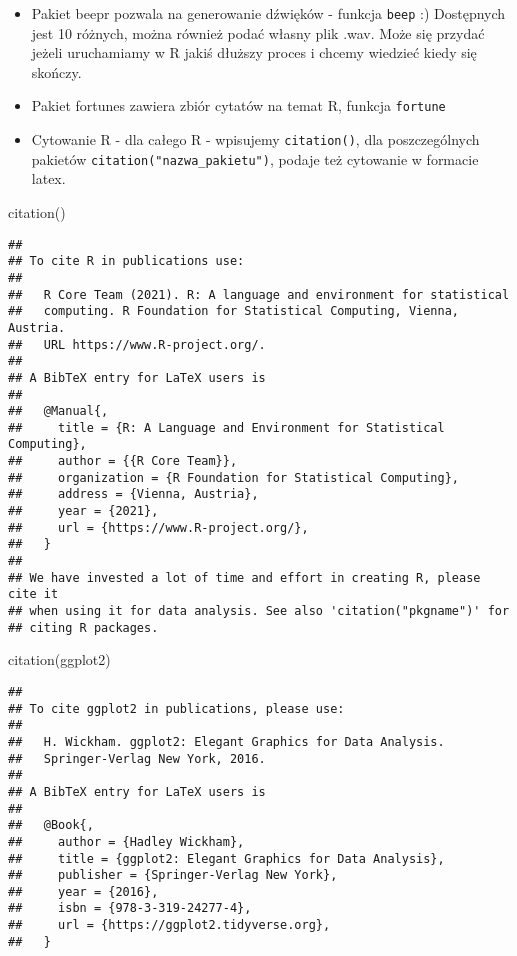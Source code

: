 \documentclass[
]{book}
\newenvironment{Shaded}{\begin{snugshade}}{\end{snugshade}}
\newcommand{\FunctionTok}[1]{\textcolor[rgb]{0.00,0.00,0.00}{#1}}
\newcommand{\NormalTok}[1]{#1}
\newcommand{\StringTok}[1]{\textcolor[rgb]{0.31,0.60,0.02}{#1}}
\begin{document}
\begin{itemize}
\item
  Pakiet beepr pozwala na generowanie dźwięków - funkcja \texttt{beep} :) Dostępnych jest 10 różnych, można również podać własny plik .wav. Może się przydać jeżeli uruchamiamy w R jakiś dłuższy proces i chcemy wiedzieć kiedy się skończy.
\item
  Pakiet fortunes zawiera zbiór cytatów na temat R, funkcja \texttt{fortune}
\item
  Cytowanie R - dla całego R - wpisujemy \texttt{citation()}, dla poszczególnych pakietów \texttt{citation("nazwa\_pakietu")}, podaje też cytowanie w formacie latex.
\end{itemize}

\begin{Shaded}
\begin{Highlighting}[]
\FunctionTok{citation}\NormalTok{()}
\end{Highlighting}
\end{Shaded}

\begin{verbatim}
## 
## To cite R in publications use:
## 
##   R Core Team (2021). R: A language and environment for statistical
##   computing. R Foundation for Statistical Computing, Vienna, Austria.
##   URL https://www.R-project.org/.
## 
## A BibTeX entry for LaTeX users is
## 
##   @Manual{,
##     title = {R: A Language and Environment for Statistical Computing},
##     author = {{R Core Team}},
##     organization = {R Foundation for Statistical Computing},
##     address = {Vienna, Austria},
##     year = {2021},
##     url = {https://www.R-project.org/},
##   }
## 
## We have invested a lot of time and effort in creating R, please cite it
## when using it for data analysis. See also 'citation("pkgname")' for
## citing R packages.
\end{verbatim}

\begin{Shaded}
\begin{Highlighting}[]
\FunctionTok{citation}\NormalTok{(}\StringTok{\textquotesingle{}ggplot2\textquotesingle{}}\NormalTok{)}
\end{Highlighting}
\end{Shaded}

\begin{verbatim}
## 
## To cite ggplot2 in publications, please use:
## 
##   H. Wickham. ggplot2: Elegant Graphics for Data Analysis.
##   Springer-Verlag New York, 2016.
## 
## A BibTeX entry for LaTeX users is
## 
##   @Book{,
##     author = {Hadley Wickham},
##     title = {ggplot2: Elegant Graphics for Data Analysis},
##     publisher = {Springer-Verlag New York},
##     year = {2016},
##     isbn = {978-3-319-24277-4},
##     url = {https://ggplot2.tidyverse.org},
##   }
\end{verbatim}

  
\end{document}
